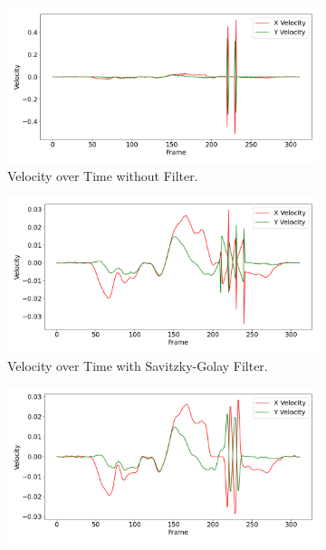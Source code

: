 \documentclass[12pt,oneside]{book} %
\begin{document}
\begin{figure}[H]
    \centering
    \begin{subfigure}[t]{0.65\textwidth}
        \includegraphics[width=\textwidth]{figures/bbox_metrics/test_indoor1 (Raw Data)_velocity.png}
        \caption{Velocity over Time without Filter.}
        \label{fig:velocity-test-indoor1-raw}
    \end{subfigure}
    \hfill
    \begin{subfigure}[t]{0.65\textwidth}
        \includegraphics[width=\textwidth]{figures/bbox_metrics/test_indoor1 (Savgol Filter)_velocity.png}
        \caption{Velocity over Time with Savitzky-Golay Filter.}
        \label{fig:velocity-test-indoor1-savgol}
    \end{subfigure}
    \vfill
    \begin{subfigure}[t]{0.65\textwidth}
        \includegraphics[width=\textwidth]{figures/bbox_metrics/test_indoor1 (Gaussian Filter)_velocity.png}

\end{subfigure}
\end{figure}
\end{document}
